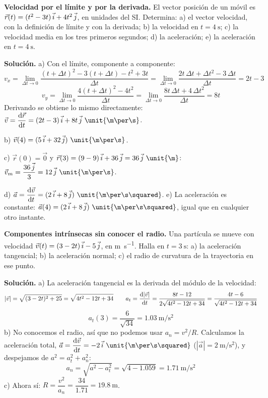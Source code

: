 \begin{example}
    \textbf{Velocidad por el límite y por la derivada.} El vector posición de un móvil es \(\vec r(t) = (t^2 - 3t)\,\vec{i} + 4t^2\,\vec{j}\),
    en unidades del SI. Determina: a) el vector velocidad, con la definición de límite y con la derivada; b) la velocidad en
    \(t = \qty{4}{\s}\); c) la velocidad media en los tres primeros segundos; d) la aceleración; e) la aceleración en
    \(t = \qty{4}{\s}\).

    \textbf{Solución.} a) Con el límite, componente a componente:
    \[ v_x = \lim_{\Delta t \to 0} \frac{(t + \Delta t)^2 - 3(t + \Delta t) - t^2 + 3t}{\Delta t} = \lim_{\Delta t \to 0}
       \frac{2t\,\Delta t + \Delta t^2 - 3\,\Delta t}{\Delta t} = 2t - 3 \]
    \[ v_y = \lim_{\Delta t \to 0} \frac{4(t + \Delta t)^2 - 4t^2}{\Delta t} = \lim_{\Delta t \to 0} \frac{8t\,\Delta t + 4\,\Delta t^2}{\Delta t}
       = 8t \]
    Derivando se obtiene lo mismo directamente: \(\vec v = \dfrac{\dif\vec r}{\dif t} = (2t - 3)\,\ivec + 8t\,\jvec~\unit{\m\per\s}\).

    b) \(\vec v(4) = (5\,\ivec + 32\,\jvec)~\unit{\m\per\s}\).

    c) \(\vec r(0) = \vec 0\) y \(\vec r(3) = (9 - 9)\,\ivec + 36\,\jvec = 36\,\jvec~\unit{\m}\):
    \(\vec v_m = \dfrac{36\,\jvec}{3} = 12\,\jvec~\unit{\m\per\s}\).

    d) \(\vec a = \dfrac{\dif\vec v}{\dif t} = (2\,\ivec + 8\,\jvec)~\unit{\m\per\s\squared}\). e) La aceleración es constante:
    \(\vec a(4) = (2\,\ivec + 8\,\jvec)~\unit{\m\per\s\squared}\), igual que en cualquier otro instante.
\end{example}

\begin{example}
    \textbf{Componentes intrínsecas sin conocer el radio.} Una partícula se mueve con velocidad \(\vec v(t) = (3 - 2t)\,\vec{i} -
    5\,\vec{j}\), en \unit{\m\per\s}. Halla en \(t = \qty{3}{\s}\): a) la aceleración tangencial; b) la aceleración normal; c) el radio
    de curvatura de la trayectoria en ese punto.

    \textbf{Solución.} a) La aceleración tangencial es la derivada del módulo de la velocidad:
    \[ |\vec v| = \sqrt{(3 - 2t)^2 + 25} = \sqrt{4t^2 - 12t + 34} \qquad
       a_t = \frac{\mathrm{d}|\vec v|}{\mathrm{d} t} = \frac{8t - 12}{2\sqrt{4t^2 - 12t + 34}} = \frac{4t - 6}{\sqrt{4t^2 - 12t + 34}} \]
    \[ a_t(3) = \frac{6}{\sqrt{34}} = \qty{1.03}{\m\per\s\squared} \]
    b) No conocemos el radio, así que no podemos usar \(a_n = v^2/R\). Calculamos la aceleración total, \(\vec a = \dfrac{\dif\vec v}{\dif t}
    = -2\,\ivec~\unit{\m\per\s\squared}\) (\(|\vec a| = \qty{2}{\m\per\s\squared}\)), y despejamos de \(a^2 = a_t^2 + a_n^2\):
    \[ a_n = \sqrt{a^2 - a_t^2} = \sqrt{4 - \num{1.059}} = \qty{1.71}{\m\per\s\squared} \]
    c) Ahora sí: \(R = \dfrac{v^2}{a_n} = \dfrac{34}{\num{1.71}} = \qty{19.8}{\m}\).
\end{example}

